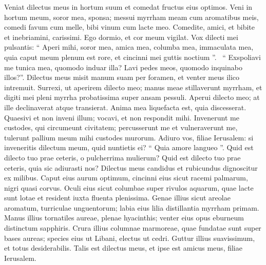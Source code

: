 \begin{biblechapter}
\begin{biblechapter}
\begin{biblechapter}
\begin{biblechapter}
\begin{biblechapter}
\verse Veniat dilectus meus in hortum suum
 et comedat fructus eius optimos.
 Veni in hortum meum, soror mea, sponsa;
 messui myrrham meam cum aromatibus meis,
 comedi favum cum melle,
 bibi vinum cum lacte meo.
 Comedite, amici, et bibite
 et inebriamini, carissimi.
 \verse Ego dormio, et cor meum vigilat.
 Vox dilecti mei pulsantis:
 “ Aperi mihi, soror mea, amica mea,
 columba mea, immaculata mea,
 quia caput meum plenum est rore, et cincinni mei guttis noctium ”. 
 \verse “ Exspoliavi me tunica mea,
 quomodo induar illa?
 Lavi pedes meos,
 quomodo inquinabo illos?”.
 \verse Dilectus meus misit manum suam per foramen,
 et venter meus ilico intremuit.
 \verse Surrexi, ut aperirem dilecto meo;
 manus meae stillaverunt myrrham,
 et digiti mei pleni myrrha probatissima
 super ansam pessuli.
 \verse Aperui dilecto meo;
 at ille declinaverat atque transierat.
 Anima mea liquefacta est, quia discesserat.
 Quaesivi et non inveni illum;
 vocavi, et non respondit mihi.
 \verse Invenerunt me custodes,
 qui circumeunt civitatem;
 percusserunt me et vulneraverunt me,
 tulerunt pallium meum mihi
 custodes murorum.
 \verse Adiuro vos, filiae Ierusalem:
 si inveneritis dilectum meum,
 quid nuntietis ei?
 “ Quia amore langueo ”.
 \verse Quid est dilecto tuo prae ceteris,
 o pulcherrima mulierum?
 Quid est dilecto tuo prae ceteris,
 quia sic adiurasti nos?
 \verse Dilectus meus candidus et rubicundus
 dignoscitur ex milibus.
 \verse Caput eius aurum optimum,
 cincinni eius sicut racemi palmarum,
 nigri quasi corvus.
 \verse Oculi eius sicut columbae
 super rivulos aquarum,
 quae lacte sunt lotae
 et resident iuxta fluenta plenissima.
 \verse Genae illius sicut areolae aromatum,
 turriculae unguentorum;
 labia eius lilia
 distillantia myrrham primam.
 \verse Manus illius tornatiles aureae,
 plenae hyacinthis;
 venter eius opus eburneum
 distinctum sapphiris.
 \verse Crura illius columnae marmoreae,
 quae fundatae sunt super bases aureas;
 species eius ut Libani,
 electus ut cedri.
 \verse Guttur illius suavissimum,
 et totus desiderabilis.
 Talis est dilectus meus, et ipse est amicus meus,
 filiae Ierusalem.
 

\end{biblechapter}
\end{biblechapter}
\end{biblechapter}
\end{biblechapter}
\end{biblechapter}
